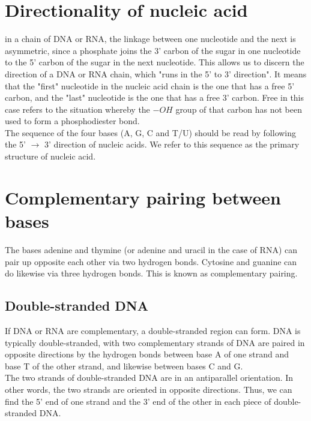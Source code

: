 \documentclass[11pt]{article}
\begin{document}
\section{Directionality of nucleic acid}
\label{sec:org27c2820}
in a chain of DNA or RNA, the linkage between one nucleotide and the next is asymmetric, since a phosphate joins the 3' carbon of the sugar in one nucleotide to the 5' carbon of the sugar in the next nucleotide. This allows us to discern the direction of a DNA or RNA chain, which "runs in the 5' to 3' direction". It means that the "first" nucleotide in the nucleic acid chain is the one that has a free 5' carbon, and the "last" nucleotide is the one that has a free 3' carbon. Free in this case refers to the situation whereby the \(-OH\) group of that carbon has not been used to form a phosphodiester bond.
\\[0pt]

The sequence of the four bases (A, G, C and T/U) should be read by following the 5' \(\rightarrow\) 3' direction of nucleic acids. We refer to this sequence as the primary structure of nucleic acid.

\section{Complementary pairing between bases}
\label{sec:org33fca67}
The bases adenine and thymine (or adenine and uracil in the case of RNA) can pair up opposite each other via two hydrogen bonds. Cytosine and guanine can do likewise via three hydrogen bonds. This is known as complementary pairing.

\subsection{Double-stranded DNA}
\label{sec:orgcfd7957}
If DNA or RNA are complementary, a double-stranded region can form. DNA is typically double-stranded, with two complementary strands of DNA are paired in opposite directions by the hydrogen bonds between base A of one strand and base T of the other strand, and likewise between bases C and G.
\\[0pt]

The two strands of double-stranded DNA are in an antiparallel orientation. In other words, the two strands are oriented in opposite directions. Thus, we can find the 5' end of one strand and the 3' end of the other in each piece of double-stranded DNA.
\\[0pt]
\end{document}
